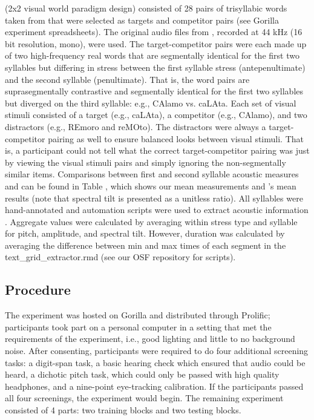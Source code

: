 (2x2 visual world paradigm design) consisted of 28 pairs of trisyllabic words taken from  that were selected as targets and competitor pairs (see Gorilla experiment spreadsheets). The original audio files from , recorded at 44 kHz (16 bit resolution, mono), were used. The target-competitor pairs were each made up of two high-frequency real words that are segmentally identical for the first two syllables but differing in stress between the first syllable stress (antepenultimate) and the second syllable (penultimate). That is, the word pairs are suprasegmentally contrastive and segmentally identical for the first two syllables but diverged on the third syllable: e.g., CAlamo vs. caLAta. Each set of visual stimuli consisted of a target (e.g., caLAta), a competitor (e.g., CAlamo), and two distractors (e.g., REmoro and reMOto). The distractors were always a target-competitor pairing as well to ensure balanced looks between visual stimuli. That is, a participant could not tell what the correct target-competitor pairing was just by viewing the visual stimuli pairs and simply ignoring the non-segmentally similar items. Comparisons between first and second syllable acoustic measures and can be found in Table , which shows our mean measurements and 's mean results (note that spectral tilt is presented as a unitless ratio). All syllables were hand-annotated and automation scripts were used to extract acoustic information . Aggregate values were calculated by averaging within stress type and syllable for pitch, amplitude, and spectral tilt. However, duration was calculated by averaging the difference between min and max times of each segment in the text\_grid\_extractor.rmd (see our OSF repository for scripts). 

\subsection{Procedure}

The experiment was hosted on Gorilla and distributed through Prolific; participants took part on a personal computer in a setting that met the requirements of the experiment, i.e., good lighting and little to no background noise. After consenting, participants were required to do four additional screening tasks: a digit-span task, a basic hearing check which ensured that audio could be heard, a dichotic pitch task, which could only be passed with high quality headphones, and a nine-point eye-tracking calibration. If the participants passed all four screenings, the experiment would begin. The remaining experiment consisted of 4 parts: two training blocks and two testing blocks. 

